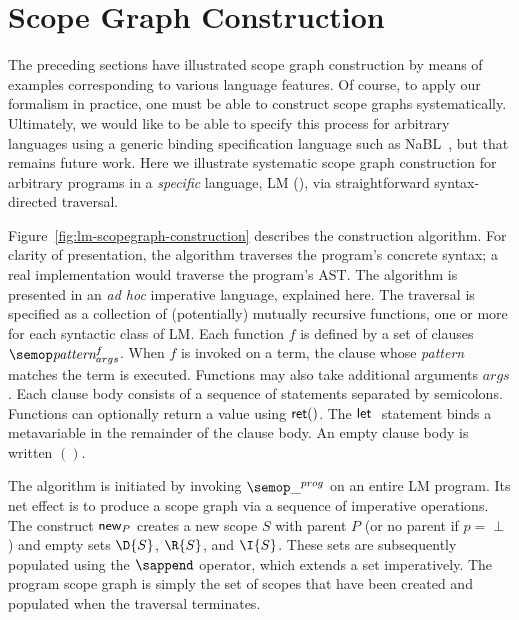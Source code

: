 \section{Scope Graph Construction}



The preceding sections have illustrated scope graph construction
by means of examples corresponding to various language features. 
Of course, to apply our formalism in practice, one must be able
to construct scope graphs systematically. Ultimately, we would
like to be able to specify this process for arbitrary 
languages using a generic binding specification language such
as NaBL~\cite{KonatKWV12}, but that remains future work.
Here we illustrate systematic scope graph construction for arbitrary
programs in a \emph{specific} language, LM (), 
via straightforward syntax-directed traversal.  

Figure~\ref{fig:lm-scopegraph-construction} describes the
construction algorithm.
For clarity of presentation, the algorithm traverses the 
program's concrete syntax; a real implementation would
traverse the program's AST.
The algorithm is presented in an {\it ad hoc} imperative language, 
explained here.  The traversal is specified as a collection of 
(potentially) mutually recursive functions, one or more for
each syntactic class of LM. Each function $f$ is
defined by a set of clauses $\sema{\mbox{\it{pattern}}}{f}{args}$.
When $f$ is invoked on a term, the clause whose {\it{pattern}} matches
the term is executed.  Functions may also take additional arguments $args$. 
Each clause body consists of a sequence of
statements separated by semicolons. Functions can optionally return a value
using $\text{\textsf{ret}}()$.
The $\text{\textsf{let }}$ \hspace*{-0.6em} statement binds 
a metavariable in the remainder of the clause body.
An empty clause body is written $()$.

The algorithm is initiated by invoking $\sema{\_}{prog}{}$ on an entire LM
program. Its net effect is to produce a scope graph via a sequence of
imperative operations. 
The construct $\text{\textsf{new}}_{P}$ creates a new scope $S$ with parent $P$ 
(or no parent if  $p = \perp$) and
empty sets $\D{S}$, $\R{S}$, and $\I{S}$. 
These sets are subsequently populated using the
$\sappend$ operator, which extends a set imperatively.
The program scope graph is simply the set of scopes that have been created
and populated when the traversal terminates.



